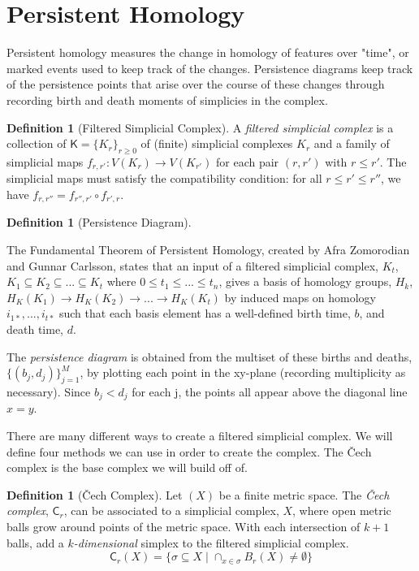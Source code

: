 \documentclass[ma]{uncgdissertationexp}
\theoremstyle{plain}
\theoremstyle{definition}
\newtheorem{definition}[theorem]{Definition}
\theoremstyle{remark}
\begin{document}
\section{Persistent Homology}
\par Persistent homology measures the change in homology of features over "time", or marked events used to keep track of the changes. Persistence diagrams keep track of the persistence points that arise over the course of these changes through recording birth and death moments of simplicies in the complex.

\begin{definition}[Filtered Simplicial Complex]
\par A \textit{filtered simplicial complex} is a collection of $\mathsf{K}=\{K_{r}\}_{r\geq 0}$ of (finite) simplicial complexes $K_{r}$ and a family of simplicial maps $f_{r, r'}: V(K_{r})\rightarrow V(K_{r'})$ for each pair $(r, r')$ with $r \leq r'$. The simplicial maps must satisfy the compatibility condition: for all $r\leq r'\leq r''$, we have $f_{r, r''} = f_{r'', r'} \circ {f_{r', r}}$.
\end{definition}

\begin{definition}[Persistence Diagram]
\label{def:persdia}
\par The Fundamental Theorem of Persistent Homology, created by Afra Zomorodian and Gunnar Carlsson\cite{computpershom}, states that an input of a filtered simplicial complex, $K_t$,  $K_{1} \subseteq K_{2} \subseteq ... \subseteq K_{t}$ where $0\leq t_{1} \leq ... \leq t_{n} $, gives a basis of homology groups, $H_{k}$, $H_{K}(K_{1}) \rightarrow H_{K}(K_{2}) \rightarrow ...\rightarrow H_{K}(K_{t})$ by induced maps on homology $i_{1*}, ..., i_{t*}$ such that each basis element has a well-defined birth time, $b$, and death time, $d$.
\par The \textit{persistence diagram} is obtained from the multiset of these births and deaths, $\{(b_{j},d_{j})\}^{M}_{j=1}$, by plotting each point in the xy-plane (recording multiplicity as necessary). Since $b_{j} < d_{j}$ for each j, the points all appear above the diagonal line $x=y$.
\end{definition}

\par There are many different ways to create a filtered simplicial complex. We will define four methods we can use in order to create the complex. The Čech complex is the base complex we will build off of.

\begin{definition}[Čech Complex]
Let $(X)$ be a finite metric space. The \textit{Čech complex}, $\mathsf{C}_r$, can be associated to a simplicial complex, $X$, where open metric balls grow around points of the metric space. With each intersection of $k+1$ balls, add a $k$\textit{-dimensional} simplex to the filtered simplicial complex.\\
$$\mathsf{C}_{r}(X) = \{\sigma \subseteq X \mid \cap_{x \in \sigma} B_{r}(X) \not= \emptyset\}$$
\end{definition}
\end{document}

